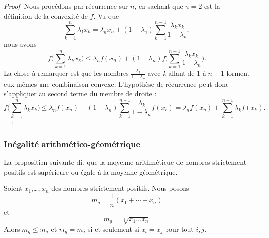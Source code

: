 \begin{proof}
	Nous procédons par récurrence sur \( n\), en sachant que \( n=2\) est la définition de la convexité de \( f\). Vu que
	\begin{equation}
		\sum_{k=1}^n\lambda_kx_k=\lambda_nx_n+(1-\lambda_n)\sum_{k=1}^{n-1}\frac{ \lambda_kx_k }{ 1-\lambda_n },
	\end{equation}
	nous avons
	\begin{equation}
		f\big( \sum_{k=1}^n\lambda_kx_k \big)\leq \lambda_nf(x_n)+(1-\lambda_n)f\big( \sum_{k=1}^{n-1}\frac{ \lambda_kx_k }{ 1-\lambda_n } \big).
	\end{equation}
	La chose à remarquer est que les nombres \( \frac{ \lambda_k }{ 1-\lambda_n }\) avec \( k\) allant de \( 1\) à \( n-1\) forment eux-mêmes une combinaison convexe. L'hypothèse de récurrence peut donc s'appliquer au second terme du membre de droite :
	\begin{equation}
		f\big( \sum_{k=1}^n\lambda_kx_k \big)\leq \lambda_nf(x_n)+(1-\lambda_n)\sum_{k=1}^{n-1}\frac{ \lambda_k }{ 1-\lambda_n }f(x_k)=\lambda_nf(x_n)+\sum_{k=1}^{n-1}\lambda_kf(x_k).
	\end{equation}
\end{proof}

\subsubsection{Inégalité arithmético-géométrique}

La proposition suivante dit que la moyenne arithmétique de nombres strictement positifs est supérieure ou égale à la moyenne géométrique.
\begin{proposition}    \label{PropWDPooBtHIAR}
	Soient \( x_1\),\ldots, \( x_n\) des nombres strictement positifs. Nous posons
	\begin{equation}
		m_a=\frac{1}{ n }(x_1+\cdots +x_n)
	\end{equation}
	et
	\begin{equation}
		m_g=\sqrt[n]{x_1\ldots x_n}
	\end{equation}
	Alors \( m_g\leq m_a\) et \( m_g=m_a\) si et seulement si \( x_i=x_j\) pour tout \( i,j\).
\end{proposition}

